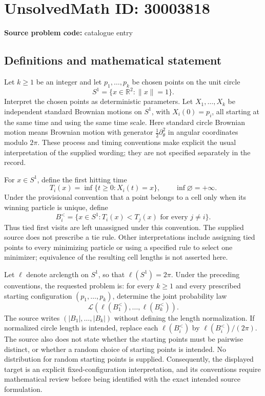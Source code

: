 \documentclass[11pt]{article}
\newcommand{\R}{\mathbb{R}}
\begin{document}
\section*{UnsolvedMath ID: 30003818}
\textbf{Source problem code:} catalogue entry
\subsection{Definitions and mathematical statement}
Let \(k\geq 1\) be an integer and let \(p_1,\ldots,p_k\) be chosen points on the unit circle
\[
S^1=\{x\in\R^2:\|x\|=1\}.
\]
Interpret the chosen points as deterministic parameters. Let \(X_1,\ldots,X_k\) be independent standard Brownian motions on \(S^1\), with \(X_i(0)=p_i\), all starting at the same time and using the same time scale. Here standard circle Brownian motion means Brownian motion with generator \(\tfrac12\partial_\theta^2\) in angular coordinates modulo \(2\pi\). These process and timing conventions make explicit the usual interpretation of the supplied wording; they are not specified separately in the record.

For \(x\in S^1\), define the first hitting time
\[
T_i(x)=\inf\{t\geq 0:X_i(t)=x\},\qquad \inf\varnothing=+\infty.
\]
Under the provisional convention that a point belongs to a cell only when its winning particle is unique, define
\[
B_i^{<}=\{x\in S^1:T_i(x)<T_j(x)\text{ for every }j\ne i\}.
\]
Thus tied first visits are left unassigned under this convention. The supplied source does not prescribe a tie rule. Other interpretations include assigning tied points to every minimizing particle or using a specified rule to select one minimizer; equivalence of the resulting cell lengths is not asserted here.

Let \(\ell\) denote arclength on \(S^1\), so that \(\ell(S^1)=2\pi\). Under the preceding conventions, the requested problem is: for every \(k\geq1\) and every prescribed starting configuration \((p_1,\ldots,p_k)\), determine the joint probability law
\[
\mathcal L\!\left(\ell(B_1^{<}),\ldots,\ell(B_k^{<})\right).
\]
The source writes \((|B_1|,\ldots,|B_k|)\) without defining the length normalization. If normalized circle length is intended, replace each \(\ell(B_i^{<})\) by \(\ell(B_i^{<})/(2\pi)\). The source also does not state whether the starting points must be pairwise distinct, or whether a random choice of starting points is intended. No distribution for random starting points is supplied. Consequently, the displayed target is an explicit fixed-configuration interpretation, and its conventions require mathematical review before being identified with the exact intended source formulation.
\end{document}
